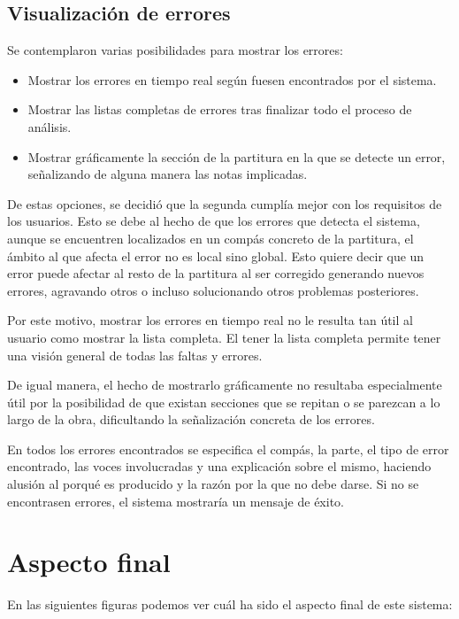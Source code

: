 \subsection{Visualización de errores}

Se contemplaron varias posibilidades para mostrar los errores:

\begin{itemize}
	\item Mostrar los errores en tiempo real según fuesen encontrados por el sistema.
	\item Mostrar las listas completas de errores tras finalizar todo el proceso de análisis.
	\item Mostrar gráficamente la sección de la partitura en la que se detecte un error, señalizando de alguna manera las notas implicadas.
\end{itemize}

De estas opciones, se decidió que la segunda cumplía mejor con los requisitos de los usuarios. Esto se debe al hecho de que los errores que detecta el sistema, aunque se encuentren localizados en un compás concreto de la partitura, el ámbito al que afecta el error no es local sino global. Esto quiere decir que un error puede afectar al resto de la partitura al ser corregido generando nuevos errores, agravando otros o incluso solucionando otros problemas posteriores. 

Por este motivo, mostrar los errores en tiempo real no le resulta tan útil al usuario como mostrar la lista completa. El tener la lista completa permite tener una visión general de todas las faltas y errores. 

De igual manera, el hecho de mostrarlo gráficamente no resultaba especialmente útil por la posibilidad de que existan secciones que se repitan o se parezcan a lo largo de la obra, dificultando la señalización concreta de los errores. 

En todos los errores encontrados se especifica el compás, la parte, el tipo de error encontrado, las voces involucradas y una explicación sobre el mismo, haciendo alusión al porqué es producido y la razón por la que no debe darse. Si no se encontrasen errores, el sistema mostraría un mensaje de éxito.

\section{Aspecto final}

En las siguientes figuras podemos ver cuál ha sido el aspecto final de este sistema:

